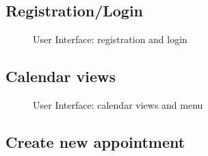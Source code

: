 \subsection{Registration/Login}

\begin{figure}[!h]
	\centering
	\caption{User Interface: registration and login}
\end{figure}
\clearpage

\subsection{Calendar views}

\begin{figure}[!h]
	\centering
	\caption{User Interface: calendar views and menu}
\end{figure}
\clearpage

\subsection{Create new appointment}

